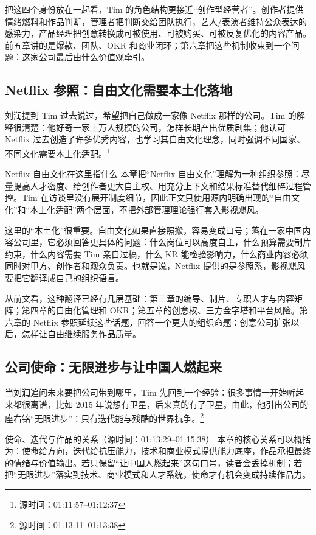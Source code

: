 \documentclass[a4paper]{article}
\begin{document}
把这四个身份放在一起看，Tim 的角色结构更接近“创作型经营者”。创作者提供情绪燃料和作品判断，管理者把判断交给团队执行，艺人/表演者维持公众表达的感染力，产品经理把创意转换成可被使用、可被购买、可被反复优化的内容产品。前五章讲的是爆款、团队、OKR 和商业闭环；第六章把这些机制收束到一个问题：这家公司最后由什么价值观牵引。

\subsection{Netflix 参照：自由文化需要本土化落地}

刘润提到 Tim 过去说过，希望把自己做成一家像 Netflix 那样的公司。Tim 的解释很清楚：他好奇一家上万人规模的公司，怎样长期产出优质剧集；他认可 Netflix 过去创造了许多优秀内容，也学习其自由文化理念，同时强调不同国家、不同文化需要本土化适配。\footnote{源时间：01:11:57--01:12:37}

\begin{knowledgebox}{Netflix 自由文化在这里指什么}
本章把“Netflix 自由文化”理解为一种组织参照：尽量提高人才密度、给创作者更大自主权、用充分上下文和结果标准替代细碎过程管控。Tim 在访谈里没有展开制度细节，因此正文只使用源内明确出现的“自由文化”和“本土化适配”两个层面，不把外部管理理论强行套入影视飓风。
\end{knowledgebox}

这里的“本土化”很重要。自由文化如果直接照搬，容易变成口号；落在一家中国内容公司里，它必须回答更具体的问题：什么岗位可以高度自主，什么预算需要制片约束，什么内容需要 Tim 亲自过稿，什么 KR 能检验影响力，什么商业内容必须同时对甲方、创作者和观众负责。也就是说，Netflix 提供的是参照系，影视飓风要把它翻译成自己的组织语言。

从前文看，这种翻译已经有几层基础：第三章的编导、制片、专职人才与内容矩阵；第四章的自由化管理和 OKR；第五章的创意权、三方金字塔和平台风险。第六章的 Netflix 参照延续这些话题，回答一个更大的组织命题：创意公司扩张以后，怎样让自由继续服务作品质量。

\subsection{公司使命：无限进步与让中国人燃起来}

当刘润追问未来要把公司带到哪里，Tim 先回到一个经验：很多事情一开始听起来都很离谱，比如 2015 年说想有卫星，后来真的有了卫星。由此，他引出公司的座右铭“无限进步”：只有迭代能与残酷的世界抗争。\footnote{源时间：01:13:11--01:13:38}

\begin{importantbox}{使命、迭代与作品的关系（源时间：01:13:29--01:15:38）}
本章的核心关系可以概括为：使命给方向，迭代给抗压能力，技术和商业模式提供能力底座，作品承担最终的情绪与价值输出。若只保留“让中国人燃起来”这句口号，读者会丢掉机制；若把“无限进步”落实到技术、商业模式和人才系统，使命才有机会变成持续作品力。
\end{importantbox}
\end{document}
